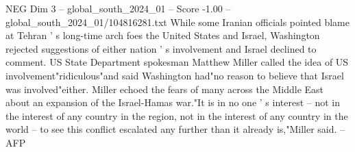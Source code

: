 \begin{textsample}{NEG Dim 3 – global\_south\_2024\_01 – Score -1.00 – global\_south\_2024\_01/104816281.txt}
While some Iranian officials pointed blame at Tehran ' s long-time arch foes the United States and Israel, Washington rejected suggestions of either nation ' s involvement and Israel declined to comment.
US State Department spokesman Matthew Miller called the idea of US involvement"ridiculous"and said Washington had"no reason to believe that Israel was involved"either.
Miller echoed the fears of many across the Middle East about an expansion of the Israel-Hamas war."It is in no one ' s interest -- not in the interest of any country in the region, not in the interest of any country in the world -- to see this conflict escalated any further than it already is,"Miller said. -- AFP

\end{textsample}
